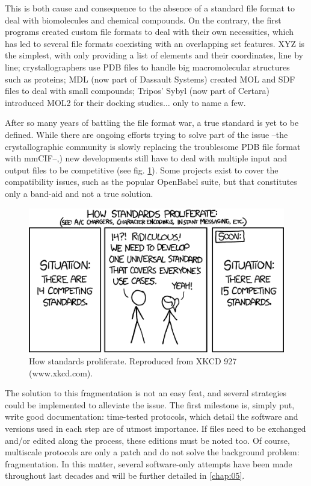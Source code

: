 This is both cause and consequence to the absence of a standard file format to deal with biomolecules and chemical compounds. On the contrary, the first programs created custom file formats to deal with their own necessities, which has led to several file formats coexisting with an overlapping set features. XYZ is the simplest, with only providing a list of elements and their coordinates, line by line; crystallographers use PDB files to handle big macromolecular structures such as proteins; MDL (now part of Dassault Systems) created MOL and SDF files to deal with small compounds; Tripos’ Sybyl (now part of Certara) introduced MOL2 for their docking studies$ \ldots $  only to name a few.

After so many years of battling the file format war, a true standard is yet to be defined. While there are ongoing efforts trying to solve part of the issue --the crystallographic community is slowly replacing the troublesome PDB file format with mmCIF--,\cite{bourne1997,berman2007}) new developments still have to deal with multiple input and output files to be competitive (see fig. \ref{fig:xkcd}). Some projects exist to cover the compatibility issues, such as the popular OpenBabel suite, \cite{oboyle2011} but that constitutes only a band-aid and not a true solution.

\begin{figure}[H]
	\includegraphics[width=\textwidth]{./figures/01/xkcd927.png}
	\caption[Proliferation of standards]{How standards proliferate. Reproduced from XKCD 927 (www.xkcd.com).}
	\label{fig:xkcd}
\end{figure}



The solution to this fragmentation is not an easy feat, and several strategies could be implemented to alleviate the issue. The first milestone is, simply put, write good documentation: time-tested protocols, which detail the software and versions used in each step are of utmost importance. If files need to be exchanged and/or edited along the process, these editions must be noted too. Of course, multiscale protocols are only a patch and do not solve the background problem: fragmentation. In this matter, several software-only attempts have been made throughout last decades and will be further detailed in \autoref{chap:05}.

